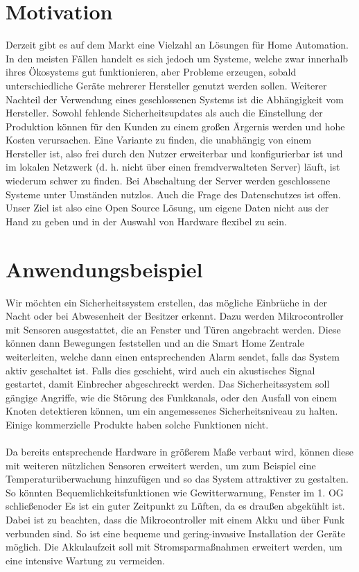 \documentclass[a4paper,10pt,twocolumn]{article}
\begin{document}
\section{Motivation}
Derzeit gibt es auf dem Markt eine Vielzahl an Lösungen für Home Automation. In den meisten Fällen handelt es sich jedoch um Systeme, welche zwar innerhalb ihres Ökosystems gut funktionieren, aber Probleme erzeugen, sobald unterschiedliche Geräte mehrerer Hersteller genutzt werden sollen. Weiterer Nachteil der Verwendung eines geschlossenen Systems ist die Abhängigkeit vom Hersteller. Sowohl fehlende Sicherheitsupdates als auch die Einstellung der Produktion können für den Kunden zu einem großen Ärgernis werden und hohe Kosten verursachen. Eine Variante zu finden, die unabhängig von einem Hersteller ist, also frei durch den Nutzer erweiterbar und konfigurierbar ist und im lokalen Netzwerk (d. h. nicht über einen fremdverwalteten Server) läuft, ist wiederum schwer zu finden. Bei Abschaltung der Server werden geschlossene Systeme unter Umständen nutzlos. Auch die Frage des Datenschutzes ist offen. Unser Ziel ist also eine Open Source Lösung, um eigene Daten nicht aus der Hand zu geben und in der Auswahl von Hardware flexibel zu sein.

\section{Anwendungsbeispiel}

Wir möchten ein Sicherheitssystem erstellen, das mögliche Einbrüche in der Nacht oder bei Abwesenheit der Besitzer erkennt. Dazu werden Mikrocontroller mit Sensoren ausgestattet, die an Fenster und Türen angebracht werden. Diese können dann Bewegungen feststellen und an die Smart Home Zentrale weiterleiten, welche dann einen entsprechenden Alarm sendet, falls das System aktiv geschaltet ist. Falls dies geschieht, wird auch ein akustisches Signal gestartet, damit Einbrecher abgeschreckt werden.
Das Sicherheitssystem soll gängige Angriffe, wie die Störung des Funkkanals, oder den Ausfall von einem Knoten detektieren können, um ein angemessenes Sicherheitsniveau zu halten. Einige kommerzielle Produkte haben solche Funktionen nicht.\\\\
Da bereits entsprechende Hardware in größerem Maße verbaut wird, können diese mit weiteren nützlichen Sensoren erweitert werden, um zum Beispiel eine Temperaturüberwachung hinzufügen und so das System attraktiver zu gestalten. So könnten Bequemlichkeitsfunktionen wie \glqq Gewitterwarnung, Fenster im 1. OG schließen\grqq  oder \glqq Es ist ein guter Zeitpunkt zu Lüften, da es draußen abgekühlt ist\grqq. Dabei ist zu beachten, dass die Mikrocontroller mit einem Akku und über Funk verbunden sind. So ist eine bequeme und gering-invasive Installation der Geräte möglich. Die Akkulaufzeit soll mit Stromsparmaßnahmen erweitert werden, um eine intensive Wartung zu vermeiden.
\end{document}
